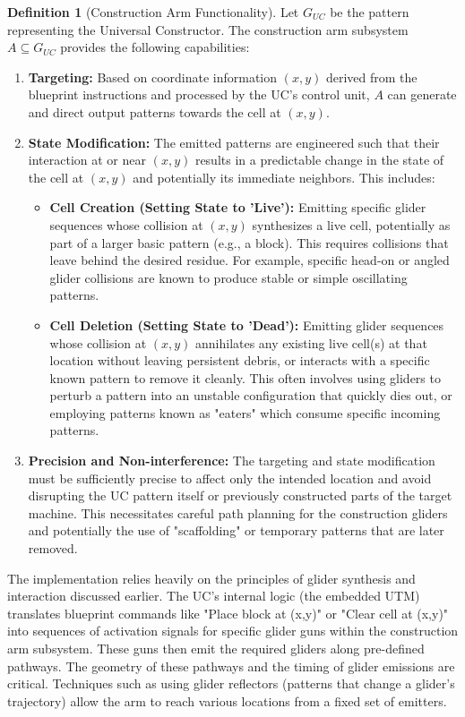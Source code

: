 \documentclass{article}
\theoremstyle{definition}
\newtheorem{definition}{Definition}[section]
\theoremstyle{plain}
\theoremstyle{plain}
\begin{document}
\begin{definition}[Construction Arm Functionality]
Let $G_{UC}$ be the pattern representing the Universal Constructor. The construction arm subsystem $A \subseteq G_{UC}$ provides the following capabilities:
\begin{enumerate}
  \item \textbf{Targeting:} Based on coordinate information $(x, y)$ derived from the blueprint instructions and processed by the UC's control unit, $A$ can generate and direct output patterns towards the cell at $(x, y)$.
  \item \textbf{State Modification:} The emitted patterns are engineered such that their interaction at or near $(x, y)$ results in a predictable change in the state of the cell at $(x, y)$ and potentially its immediate neighbors. This includes:
    \begin{itemize}
      \item \textbf{Cell Creation (Setting State to 'Live'):} Emitting specific glider sequences whose collision at $(x, y)$ synthesizes a live cell, potentially as part of a larger basic pattern (e.g., a block). This requires collisions that leave behind the desired residue. For example, specific head-on or angled glider collisions are known to produce stable or simple oscillating patterns.
      \item \textbf{Cell Deletion (Setting State to 'Dead'):} Emitting glider sequences whose collision at $(x, y)$ annihilates any existing live cell(s) at that location without leaving persistent debris, or interacts with a specific known pattern to remove it cleanly. This often involves using gliders to perturb a pattern into an unstable configuration that quickly dies out, or employing patterns known as "eaters" which consume specific incoming patterns.
    \end{itemize}
  \item \textbf{Precision and Non-interference:} The targeting and state modification must be sufficiently precise to affect only the intended location and avoid disrupting the UC pattern itself or previously constructed parts of the target machine. This necessitates careful path planning for the construction gliders and potentially the use of "scaffolding" or temporary patterns that are later removed.
\end{enumerate}
\end{definition}

The implementation relies heavily on the principles of glider synthesis and interaction discussed earlier. The UC's internal logic (the embedded UTM) translates blueprint commands like "Place block at (x,y)" or "Clear cell at (x,y)" into sequences of activation signals for specific glider guns within the construction arm subsystem. These guns then emit the required gliders along pre-defined pathways. The geometry of these pathways and the timing of glider emissions are critical. Techniques such as using glider reflectors (patterns that change a glider's trajectory) allow the arm to reach various locations from a fixed set of emitters.
\end{document}
